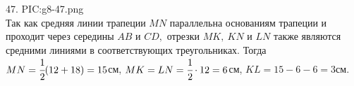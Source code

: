 47. {{PIC:g8-47.png}}\\
Так как средняя линии трапеции $MN$ параллельна основаниям трапеции и проходит через середины $AB$ и $CD,$ отрезки $MK,\ KN$ и $LN$ также являются средними линиями в соответствующих треугольниках. Тогда $MN=\cfrac{1}{2}(12+18)=15$см, $MK=LN=\cfrac{1}{2}\cdot12=6$см, $KL=15-6-6=3$см.\\
